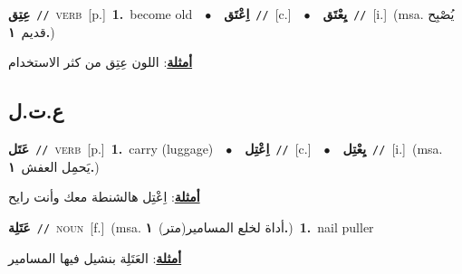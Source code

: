 \documentclass[10pt,a4paper,twoside]{article} %
\begin{document}
\begin{multicols}{2}
{\setlength\topsep{0pt}\textbf{\foreignlanguage{arabic}{عِتِق}}\ {\color{gray}\texttt{//}\color{black}}\ \textsc{verb}\ [p.]\ \textbf{1.}~become old\ \ $\bullet$\ \ \setlength\topsep{0pt}\textbf{\foreignlanguage{arabic}{اِعْتَق}}\ {\color{gray}\texttt{//}\color{black}}\ [c.]\ \ $\bullet$\ \ \setlength\topsep{0pt}\textbf{\foreignlanguage{arabic}{يِعْتَق}}\ {\color{gray}\texttt{//}\color{black}}\ [i.]\ \color{gray}(msa. \foreignlanguage{arabic}{يُصْبِح قديم}~\foreignlanguage{arabic}{\textbf{١.}})\color{black}\  \begin{flushright}\color{gray}\foreignlanguage{arabic}{\textbf{\underline{\foreignlanguage{arabic}{أمثلة}}}: اللون عِتِق من كثر الاستخدام}\end{flushright}\color{black}} \vspace{2mm}

\vspace{-3mm}
\subsection*{\color{blue}\foreignlanguage{arabic}{ع.ت.ل}\color{blue}{}} 

{\setlength\topsep{0pt}\textbf{\foreignlanguage{arabic}{عَتَل}}\ {\color{gray}\texttt{//}\color{black}}\ \textsc{verb}\ [p.]\ \textbf{1.}~carry (luggage)\ \ $\bullet$\ \ \setlength\topsep{0pt}\textbf{\foreignlanguage{arabic}{اِعْتِل}}\ {\color{gray}\texttt{//}\color{black}}\ [c.]\ \ $\bullet$\ \ \setlength\topsep{0pt}\textbf{\foreignlanguage{arabic}{يِعْتِل}}\ {\color{gray}\texttt{//}\color{black}}\ [i.]\ \color{gray}(msa. \foreignlanguage{arabic}{يَحمِل العفش}~\foreignlanguage{arabic}{\textbf{١.}})\color{black}\  \begin{flushright}\color{gray}\foreignlanguage{arabic}{\textbf{\underline{\foreignlanguage{arabic}{أمثلة}}}: اِعْتِل هالشنطة معك وأنت رايح}\end{flushright}\color{black}} \vspace{2mm}

{\setlength\topsep{0pt}\textbf{\foreignlanguage{arabic}{عَتَلِة}}\ {\color{gray}\texttt{//}\color{black}}\ \textsc{noun}\ [f.]\ \color{gray}(msa. \foreignlanguage{arabic}{أداة لخلع المسامير(متر)}~\foreignlanguage{arabic}{\textbf{١.}})\color{black}\ \textbf{1.}~nail puller\  \begin{flushright}\color{gray}\foreignlanguage{arabic}{\textbf{\underline{\foreignlanguage{arabic}{أمثلة}}}: العَتَلِة بنشيل فيها المسامير}\end{flushright}\color{black}} \vspace{2mm}


\end{multicols}
\end{document}
